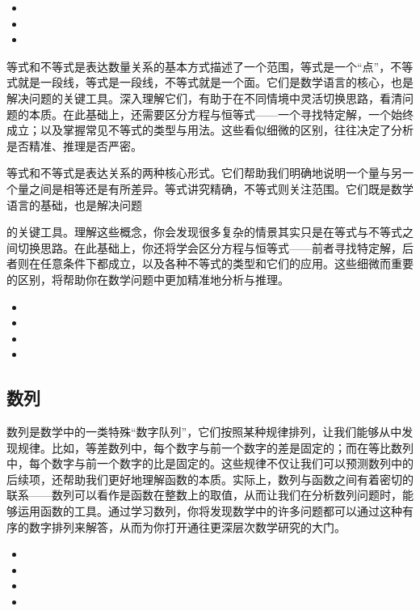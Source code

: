 \begin{itemize}
\item {}
\item {}
\item {}
\end{itemize}

等式和不等式是表达数量关系的基本方式描述了一个范围，等式是一个“点”，不等式就是一段线，等式是一段线，不等式就是一个面。它们是数学语言的核心，也是解决问题的关键工具。深入理解它们，有助于在不同情境中灵活切换思路，看清问题的本质。在此基础上，还需要区分方程与恒等式——一个寻找特定解，一个始终成立；以及掌握常见不等式的类型与用法。这些看似细微的区别，往往决定了分析是否精准、推理是否严密。

等式和不等式是表达关系的两种核心形式。它们帮助我们明确地说明一个量与另一个量之间是相等还是有所差异。等式讲究精确，不等式则关注范围。它们既是数学语言的基础，也是解决问题

的关键工具。理解这些概念，你会发现很多复杂的情景其实只是在等式与不等式之间切换思路。在此基础上，你还将学会区分方程与恒等式——前者寻找特定解，后者则在任意条件下都成立，以及各种不等式的类型和它们的应用。这些细微而重要的区别，将帮助你在数学问题中更加精准地分析与推理。

\begin{itemize}
\item {}
\item {}
\item {}
\item {}
\end{itemize}

\subsection{数列}

数列是数学中的一类特殊“数字队列”，它们按照某种规律排列，让我们能够从中发现规律。比如，等差数列中，每个数字与前一个数字的差是固定的；而在等比数列中，每个数字与前一个数字的比是固定的。这些规律不仅让我们可以预测数列中的后续项，还帮助我们更好地理解函数的本质。实际上，数列与函数之间有着密切的联系——数列可以看作是函数在整数上的取值，从而让我们在分析数列问题时，能够运用函数的工具。通过学习数列，你将发现数学中的许多问题都可以通过这种有序的数字排列来解答，从而为你打开通往更深层次数学研究的大门。

\begin{itemize}
\item {}
\item {}
\item {}
\item {}
\end{itemize}
